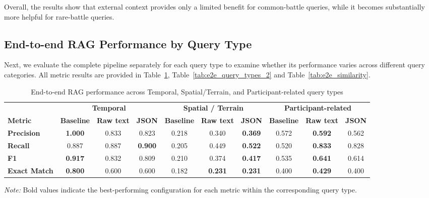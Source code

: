 Overall, the results show that external context provides only a limited benefit for common-battle queries, while it becomes substantially more helpful for rare-battle queries.
\subsection{End-to-end RAG Performance by Query Type}
Next, we evaluate the complete pipeline separately for each query type to examine whether its performance varies across different query categories. All metric results are provided in Table~\ref{tab:e2e_query_types_1}, Table~\ref{tab:e2e_query_types_2} and Table~\ref{tab:e2e_similarity}.
\begin{table}[H]
    \centering
    \caption{End-to-end RAG performance across Temporal, Spatial/Terrain, and Participant-related query types}
    \label{tab:e2e_query_types_1}

    \scriptsize
    \renewcommand{\arraystretch}{1.4}
    \setlength{\tabcolsep}{3pt}

    \begin{tabular}{l ccc ccc ccc}
        \toprule
        & \multicolumn{3}{c}{\textbf{Temporal}}
        & \multicolumn{3}{c}{\textbf{Spatial / Terrain}}
        & \multicolumn{3}{c}{\textbf{Participant-related}} \\
        \cmidrule(lr){2-4}
        \cmidrule(lr){5-7}
        \cmidrule(lr){8-10}

        \textbf{Metric} &
        \textbf{Baseline} & \textbf{Raw text} & \textbf{JSON} &
        \textbf{Baseline} & \textbf{Raw text} & \textbf{JSON} &
        \textbf{Baseline} & \textbf{Raw text} & \textbf{JSON} \\
        \midrule

        \textbf{Precision} &
        \textbf{1.000} & 0.833 & 0.823 &
        0.218 & 0.340 & \textbf{0.369} &
        0.572 & \textbf{0.592} & 0.562 \\

        \textbf{Recall} &
        0.887 & 0.887 & \textbf{0.900} &
        0.205 & 0.449 & \textbf{0.522} &
        0.520 & \textbf{0.833} & 0.828 \\

        \textbf{F1} &
        \textbf{0.917} & 0.832 & 0.809 &
        0.210 & 0.374 & \textbf{0.417} &
        0.535 & \textbf{0.641} & 0.614 \\

        \textbf{Exact Match} &
        \textbf{0.800} & 0.600 & 0.600 &
        0.182 & \textbf{0.231} & \textbf{0.231} &
        0.400 & \textbf{0.429} & 0.400 \\

        \bottomrule
    \end{tabular}

    \par\vspace{4pt}
    \begin{minipage}{\linewidth}
        \footnotesize
        \textit{Note:} Bold values indicate the best-performing
        configuration for each metric within the corresponding
        query type.
    \end{minipage}

\end{table}
